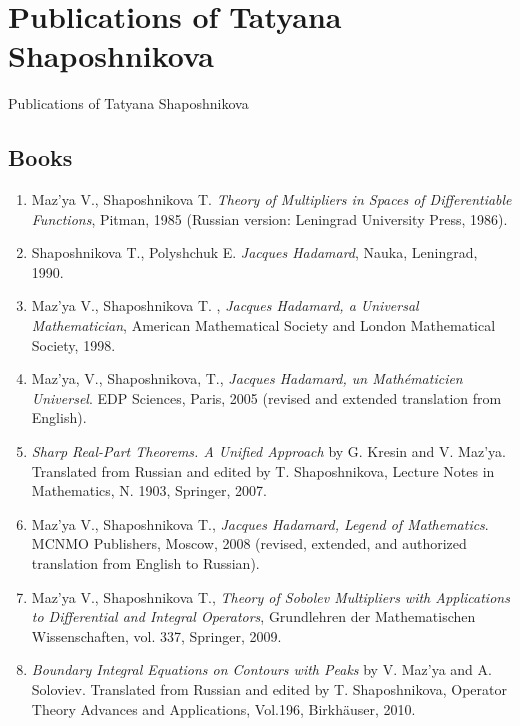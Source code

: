 \documentclass{article}
\begin{document}
\parindent=0pt
\addtolength{\parskip}{3pt}
\addtolength{\textwidth}{10em}
\addtolength{\textheight}{12em}
\def\tc{\mathaccent"7017}
\textwidth=400pt
\section*{Publications of Tatyana Shaposhnikova}

\pagestyle{myheadings}\thispagestyle{empty}
            {Publications of Tatyana Shaposhnikova}
\subsection*{Books}

\begin{enumerate}
\item Maz'ya V., Shaposhnikova T. {\it Theory of Multipliers in
Spaces of Differentiable Functions}, Pitman, 1985 (Russian
version: Leningrad University Press, 1986).

\item Shaposhnikova T., Polyshchuk E. {\it Jacques Hadamard}, Nauka,
Leningrad, 1990.

\item Maz'ya V., Shaposhnikova T. , {\it Jacques Hadamard, a
Universal Mathematician}, American Mathematical Society and
London Mathematical Society, 1998.

\item Maz'ya, V., Shaposhnikova, T., 
{\it Jacques Hadamard, un Math\'ematicien Universel}. EDP Sciences, Paris, 2005 
(revised and extended translation from English).

\item 
{\it Sharp Real-Part Theorems. A Unified Approach} by G. Kresin and V. Maz'ya. Translated from Russian and edited by T. Shaposhnikova, Lecture Notes in Mathematics, N. 1903, Springer, 2007.

\item Maz'ya V., Shaposhnikova T., {\it Jacques Hadamard, Legend of  Mathematics}. MCNMO Publishers, Moscow, 2008 (revised,  extended, and  authorized translation from English to Russian).

\item Maz'ya V., Shaposhnikova T., {\it Theory of Sobolev Multipliers with Applications to Differential and Integral Operators}, Grundlehren der Mathematischen Wissenschaften, vol. 337, Springer, 2009.


\item
{\it Boundary Integral Equations on Contours with Peaks} by V. Maz'ya and A. Soloviev. Translated from Russian and edited by T. Shaposhnikova, Operator Theory Advances and Applications, Vol.196, Birkh\"auser,  2010.

\end{enumerate}
\end{document}
